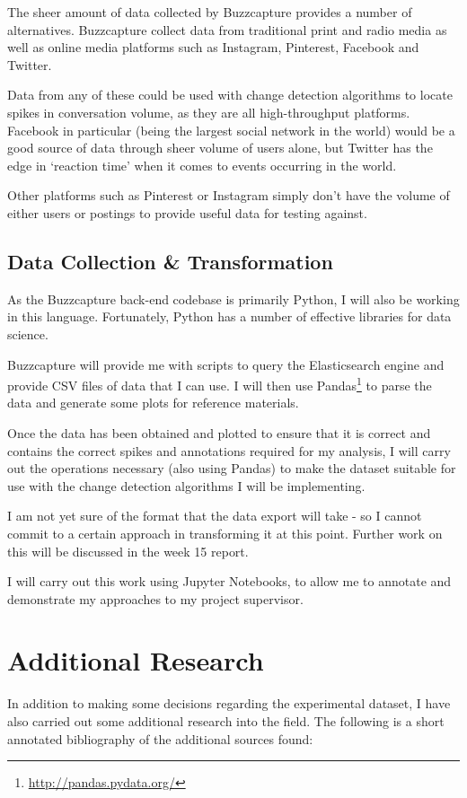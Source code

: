 \documentclass{mattreport}
\begin{document}
The sheer amount of data collected by Buzzcapture provides a number of alternatives. Buzzcapture collect data from traditional print and radio media as well as online media platforms such as Instagram, Pinterest, Facebook and Twitter.

Data from any of these could be used with change detection algorithms to locate spikes in conversation volume, as they are all high-throughput platforms. Facebook in particular (being the largest social network in the world) would be a good source of data through sheer volume of users alone, but Twitter has the edge in `reaction time' when it comes to events occurring in the world.

Other platforms such as Pinterest or Instagram simply don't have the volume of either users or postings to provide useful data for testing against.

\subsection{Data Collection \& Transformation}

As the Buzzcapture back-end codebase is primarily Python, I will also be working in this language. Fortunately, Python has a number of effective libraries for data science.

Buzzcapture will provide me with scripts to query the Elasticsearch engine and provide CSV files of data that I can use. I will then use Pandas\footnote{\url{http://pandas.pydata.org/}} to parse the data and generate some plots for reference materials.

Once the data has been obtained and plotted to ensure that it is correct and contains the correct spikes and annotations required for my analysis, I will carry out the operations necessary (also using Pandas) to make the dataset suitable for use with the change detection algorithms I will be implementing.

I am not yet sure of the format that the data export will take - so I cannot commit to a certain approach in transforming it at this point. Further work on this will be discussed in the week 15 report.

I will carry out this work using Jupyter Notebooks, to allow me to annotate and demonstrate my approaches to my project supervisor.

\section{Additional Research}

In addition to making some decisions regarding the experimental dataset, I have also carried out some additional research into the field. The following is a short annotated bibliography of the additional sources found:\\




\newpage
\printbibliography
\end{document}
